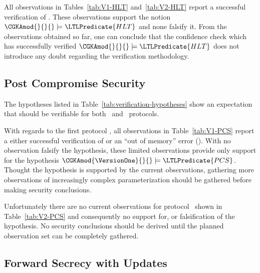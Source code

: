 All observations in Tables\ \ref{tab:V1-HLT} and\ \ref{tab:V2-HLT} report a successful verification of .
These observations support the notion \( \CGKAmod{}{}{} \models \LTLPredicate{HLT} \) and none falsify it.
From the observations obtained so far, one can conclude that the confidence check which has successfully verified \( \CGKAmod{}{}{} \models \LTLPredicate{HLT} \) does not introduce any doubt regarding the verification methodology.


\hypertarget{sec:post-compromise-security-results}{%
\subsection{Post Compromise Security}\label{sec:post-compromise-security-results}}

The hypotheses listed in Table\ \ref{tab:verification-hypotheses} show an expectation that  should be verifiable for both \VersionOne\ and \VersionTwo\ protocols.

With regards to the first protocol \VersionOne, all observations in Table\ \ref{tab:V1-PCS} report a either successful verification of  or an ``out of memory'' error (\OutOfMemory).
With no observation falsify the hypothesis, these limited observations provide only support for the hypothesis \( \CGKAmod{\VersionOne}{}{} \models \LTLPredicate{PCS} \).
Thought the hypothesis is supported by the current observations, gathering more observations of increasingly complex \CGKAmod{\VersionOne}{}{} parameterization should be gathered before making security conclusions.

Unfortunately there are no current observations for protocol \VersionTwo\ shown in Table\ \ref{tab:V2-PCS} and consequently no support for, or falsification of the hypothesis.
No security conclusions should be derived until the planned observation set can be completely gathered. 


\hypertarget{sec:forward-secrecy-results}{%
\subsection{Forward Secrecy with Updates}\label{sec:forward-secrecy-results}}

